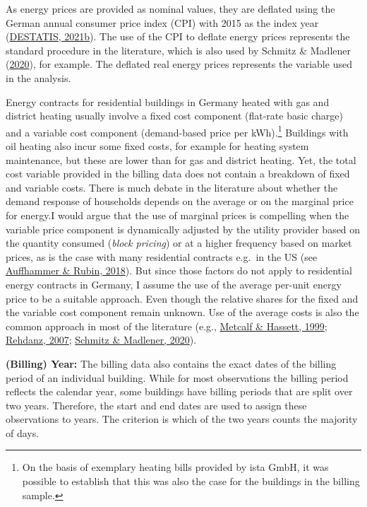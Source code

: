 \documentclass[12pt,twoside]{reedthesis}
\begin{document}
As energy prices are provided as nominal values, they are deflated using the German annual consumer price index (CPI) with 2015 as the index year (\protect\hyperlink{ref-destatis21}{DESTATIS, 2021b}). The use of the CPI to deflate energy prices represents the standard procedure in the literature, which is also used by Schmitz \& Madlener (\protect\hyperlink{ref-schmitz_madlener20}{2020}), for example. The deflated real energy prices represents the variable used in the analysis.

Energy contracts for residential buildings in Germany heated with gas and district heating usually involve a fixed cost component (flat-rate basic charge) and a variable cost component (demand-based price per kWh).\footnote{On the basis of exemplary heating bills provided by ista GmbH, it was possible to establish that this was also the case for the buildings in the billing sample.} Buildings with oil heating also incur some fixed costs, for example for heating system maintenance, but these are lower than for gas and district heating. Yet, the total cost variable provided in the billing data does not contain a breakdown of fixed and variable costs. There is much debate in the literature about whether the demand response of households depends on the average or on the marginal price for energy.I would argue that the use of marginal prices is compelling when the variable price component is dynamically adjusted by the utility provider based on the quantity consumed (\emph{block pricing}) or at a higher frequency based on market prices, as is the case with many residential contracts e.g.~in the US (see \protect\hyperlink{ref-auffhammer_rubin18}{Auffhammer \& Rubin, 2018}). But since those factors do not apply to residential energy contracts in Germany, I assume the use of the average per-unit energy price to be a suitable approach. Even though the relative shares for the fixed and the variable cost component remain unknown. Use of the average costs is also the common approach in most of the literature (e.g., \protect\hyperlink{ref-metcalf_hassett99}{Metcalf \& Hassett, 1999}; \protect\hyperlink{ref-rehdanz07}{Rehdanz, 2007}; \protect\hyperlink{ref-schmitz_madlener20}{Schmitz \& Madlener, 2020}).

\textbf{(Billing) Year:} The billing data also contains the exact dates of the billing period of an individual building. While for most observations the billing period reflects the calendar year, some buildings have billing periods that are split over two years. Therefore, the start and end dates are used to assign these observations to years. The criterion is which of the two years counts the majority of days.
\end{document}
